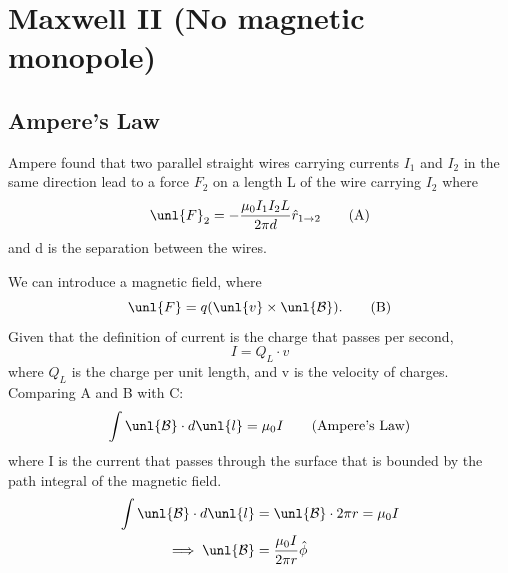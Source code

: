 \documentclass[a4paper, 11pt, normalem]{report}
\newcommand\B{\mathcal{B}}
\newcommand\uB{\unl{\B}}
\newcommand\hr{\hat{r}}
\begin{document}
\section{Maxwell \RN{2} (No magnetic monopole)}
\subsection{Ampere's Law}
Ampere found that two parallel straight wires carrying currents $I_1$ and $I_2$ in the same direction lead to a force $F_2$ on a length L of the wire carrying $I_2$ where
\begin{equation}
    \unl{F}_2 = -\frac{\mu_0 I_1 I_2 L}{2\pi d}\hr_{1\to2} \tag{A}
\end{equation}
and d is the separation between the wires.

We can introduce a magnetic field, where
\begin{equation}
    \unl{F} = q(\unl{v}\times\uB). \tag{B}
\end{equation}
Given that the definition of current is the charge that passes per second,
\begin{equation}
    I = Q_L\cdot v \tag{C}
\end{equation}
where $Q_L$ is the charge per unit length, and v is the velocity of charges. \\
Comparing A and B with C:
\begin{equation}
    \int \uB \cdot d\unl{l} = \mu_0 I \tag{Ampere's Law}
\end{equation}
where I is the current that passes through the surface that is bounded by the path integral of the magnetic field.
\begin{align*}
    \int \uB\cdot d\unl{l} &= \uB\cdot2\pi r = \mu_0 I \\
    \implies \uB &= \frac{\mu_0 I}{2\pi r}\hat{\phi} \\
\end{align*}
\end{document}
